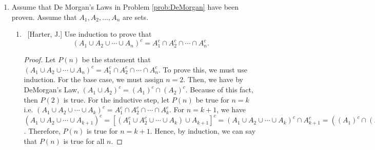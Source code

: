 \documentclass[10pt]{article}
\begin{document}
\begin{enumerate}
\begin{enumerate}
\begin{proof}
\end{proof}
	\item  ~[Krason, T.] Show that for an arbitrary function $g: \mathbb{R} \to \mathbb{R}$ that $g^{-1}(A \cup B) = g^{-1}(A) \cup g^{-1}(B)$.
\begin{proof}
Now, we want to show that $g^{-1}(A \cup B)= g^{-1}(A)\cup g^{-1}(B)$. Following the usual pattern, we want to show first that $g^{-1}(A \cup B) \subseteq g^{-1}(A) \cup g^{-1}(B)$, so suppose that $x \in g^{-1}(A \cup B)$. By definition, this means that $g(x)\in A \cup B$, so $g(x)\in A$ or $g(x)\in B$. Stated equivalently, $x \in g^{-1}(A)$ or $x \in g^{-1}(B)$, which implies that $x \in g^{-1}(A) \cup g^{-1}(B)$. Since our choice of $x$ was arbitrary, we see that $g^{-1}(A \cup B) \subseteq g^{-1}(A) \cup g^{-1}(B)$.  To show the other inclusion, suppose $x \in g^{-1}(A) \cup g^{-1}(B)$. This means that $x \in g^{-1}(A)$ or $x \in g^{-1}(B)$, which is to say that $g(x)\in A$ or $g(x) \in B$. Either way, $g(x) \in A \cup B$, and so $x \in g^{-1}(A \cup B)$. Since the choice of $x$ was arbitrary, we see that $g^{-1}(A) \cup g^{-1}(B) \subseteq g^{-1}(A \cup B)$.Having shown both inclusions, we can conclude that $g^{-1}(A \cup B)= g^{-1}(A)\cup g^{-1}(B)$, as desired.
\end{proof}
	\end{enumerate}
	
\item  Assume that De Morgan's Laws in Problem \ref{prob:DeMorgan} have been proven.  Assume that $A_1, A_2, \ldots, A_n$ are sets.

	\begin{enumerate}
	
	\item  ~[Harter, J.] Use induction to prove that $$\left( A_1 \cup A_2 \cup \cdots \cup A_n \right)^c = A_1^c \cap A_2^c \cap \cdots \cap A_n^c.$$
 \begin{proof}
Let $P(n)$ be the statement that $(A_1 \cup A_2 \cup \cdots \cup A_n)^c = A_1^c \cap A_2^c \cap \cdots \cap A_n^c$.  To prove this, we must use induction.  For the base case, we must assign $n = 2$.  Then, we have by DeMorgan's Law, $(A_1 \cup A_2)^c = (A_1)^{c} \cap (A_2)^c$.  Because of this fact, then $P(2)$ is true.  For the inductive step, let $P(n)$ be true for $n = k$ i.e. $(A_1 \cup A_2 \cup \cdots \cup A_k)^c = A_1^c \cap A_2^c \cap \cdots \cap A_k^c$.  For $n = k+1$, we have $(A_1 \cup A_2 \cup \cdots \cup A_{k+1})^c = [(A_1^c \cup A_2^c \cup \cdots \cup A_{k}) \cup A_{k+1}]^c = (A_1 \cup A_2 \cup \cdots \cup A_k)^c \cap A_{k+1}^c = ((A_1)^c \cap (A_2)^c \cap \cdots (A_k)^c) \cap (A_{k+1})^c = (A_1)^c \cap (A_2)^c \cap \cdots \cap (A_{k+1})^c$.  Therefore, $P(n)$ is true for $n = k+1$.  Hence, by induction, we can say that $P(n)$ is true for all $n$.
 \end{proof}
	

\end{enumerate}
\end{enumerate}
\end{document}
